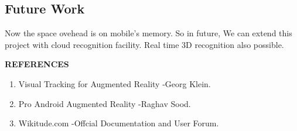 \documentclass{article}
\begin{document}
\subsection{Future Work}
\par Now the space ovehead is on mobile's memory. So in future, We can extend this project with cloud recognition facility. Real time 3D recognition also possible.






\newpage
% 
{\centering \Large \textbf{REFERENCES}}\\[.5cm]
\begin{enumerate}
\item Visual Tracking for Augmented Reality -Georg Klein.
\item Pro Android Augmented Reality  -Raghav Sood.
\item Wikitude.com -Offcial Documentation and User Forum.
\end{enumerate}
\end{document}
